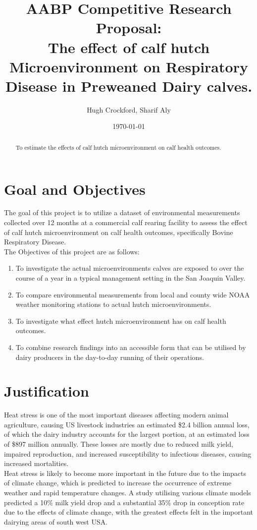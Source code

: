 \documentclass[12pt]{article}
\title{AABP Competitive Research Proposal:\\The effect of calf hutch Microenvironment on Respiratory Disease in Preweaned Dairy calves.}
\author{Hugh Crockford, Sharif Aly}
\date{\today}
\begin{document}
	\maketitle
	\tableofcontents
	
	\newpage
	\begin{abstract}
		To estimate the effects of calf hutch microenvironment on calf health outcomes.
	\end{abstract} 
	\section{Goal and Objectives}
	The goal of this project is to utilize a dataset of environmental measurements collected over 12 months at a commercial calf rearing facility to assess the effect of calf hutch microenvironment on calf health outcomes, specifically Bovine Respiratory Disease.\\


	The Objectives of this project are as follows:
	\begin{enumerate}
		\item To investigate the actual microenvironments calves are exposed to over the course of a year in a typical management setting in the San Joaquin Valley.
		\item To compare environmental measurements from local and county wide NOAA weather monitoring stations to actual hutch microenvironments.
		\item To investigate what effect hutch microenvironment has on calf health outcomes. 
		\item To combine research findings into an accessible form that can be utilised by dairy producers in the day-to-day running of their operations.
	\end{enumerate}


	\newpage
	\section{Justification}
	Heat stress is one of the most important diseases affecting modern animal agriculture, causing US livestock industries an estimated \$2.4 billion annual loss, of which the dairy industry accounts for the largest portion, at an estimated loss of \$897 million annually\cite{St-Pierre2003}. 
	These losses are mostly due to reduced milk yield, impaired reproduction, and increased susceptibility to infectious diseases, causing increased mortalities.\cite{Kadzere2002,Hammami2013}\\
	Heat stress is likely to become more important in the future due to the impacts of climate change, which is predicted to increase the occurrence of extreme weather and rapid temperature changes\cite{Parry2007}. A study utilising various climate models predicted a 10\% milk yield drop and a substantial 35\% drop in conception rate due to the effects of climate change, with the greatest effects felt in the important dairying areas of south west USA\cite{Klinedinst1993}.\\
\end{document}
